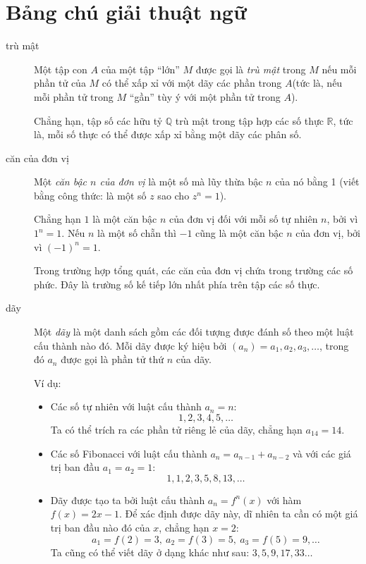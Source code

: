 \section*{Bảng chú giải thuật ngữ}
\begin{description}
	\item[trù mật] Một tập con $A$ của một tập \enquote{lớn} $M$ được gọi là \emph{trù mật} trong $M$ nếu mỗi phần tử của $M$ có thể xấp xỉ với một dãy các phần trong $A$(tức là, nếu mỗi phần tử trong $M$ \enquote{gần} tùy ý với một phần tử trong $A$).

		Chẳng hạn, tập số các hữu tỷ $\mathbb Q$ trù mật trong tập hợp các số thực $\mathbb R$, tức là, mỗi số thực có thể được xấp xỉ bằng một dãy các phân số. 

	\item[căn của đơn vị] Một \emph{căn bậc $n$ của đơn vị } là một số mà lũy thừa bậc $n$ của nó bằng 1 (viết bằng công thức: là một số $z$ sao cho $z^n=1$). 

		Chẳng hạn $1$ là một căn bậc $n$ của đơn vị đối với mỗi số tự nhiên $n$, bởi vì $1^n=1$. Nếu $n$ là một số chẵn thì $-1$ cũng là một căn bậc $n$ của đơn vị, bởi vì $(-1)^n=1$.

		Trong trường hợp tổng quát, các căn của đơn vị chứa trong trường các số phức. Đây là trường số kế tiếp lớn nhất phía trên tập các số thực. 

	\item[dãy] Một \emph{dãy} là một danh sách gồm các đối tượng được đánh số theo một luật cấu thành nào đó. Mỗi dãy được ký hiệu bởi $(a_n) = a_1,a_2,a_3,\dots $, trong đó $a_n$ được gọi là phần tử thứ $n$ của dãy. 

		Ví dụ:
		\begin{itemize}
		\item Các số tự nhiên với luật cấu thành $a_n = n$:
		\begin{equation*}
		1,2,3,4,5,\dots{}
		\end{equation*}
		Ta có thể trích ra các phần tử riêng lẻ của dãy, chẳng hạn $a_{14} = 14$. 
		\item Các số Fibonacci với luật cấu thành $a_n = a_{n-1}+a_{n-2}$ và với các giá trị ban đầu $a_1 = a_2 = 1$:
		\begin{equation*}
		1,1,2,3,5,8,13,\dots{}
		\end{equation*}
		\item Dãy được tạo ta bởi luật cấu thành $a_n = f^n(x)$ với hàm $f(x) = 2x-1$. Để xác định được dãy này, dĩ nhiên ta cần có một giá trị ban đầu nào đó của $x$, chẳng hạn $x=2$: 
		\begin{equation*}
		a_1 = f(2) = 3,\ a_2 = f(3) = 5,\ a_3 = f(5) = 9,\dots
		\end{equation*}
		Ta cũng có thể viết dãy ở dạng khác như sau: $3,5,9,17,33\dots{}$
		\end{itemize}


\end{description}
